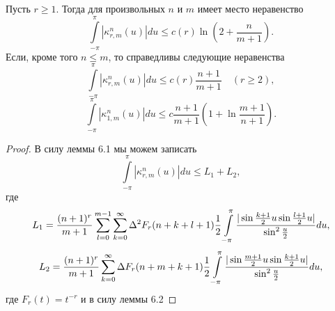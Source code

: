 \begin{lemma}\label{l6.3}
Пусть $r\ge1$. Тогда для произвольных $n$ и $m$ имеет место неравенство
$$
\int\limits_{-\pi}^{\pi}|\kappa_{r,m}^n(u)|du\le c(r)\ln\left(2+\frac{n}{m+1}\right) .
$$
Если, кроме того $n\le m$, то справедливы  следующие неравенства
$$
\int\limits_{-\pi}^{\pi}|\kappa_{r,m}^n(u)|du\le c(r)\frac{n+1}{m+1}\quad (r\ge2),
$$
$$
\int\limits_{-\pi}^{\pi}|\kappa_{1,m}^n(u)|du\le c\frac{n+1}{m+1}\left(1+\ln\frac{m+1}{n+1}\right).
$$





 \end{lemma}
\begin{proof}
 В силу леммы 6.1 мы можем записать
 \begin{equation}\label{6.25}
    \int\limits_{-\pi}^{\pi}|\kappa_{r,m}^n(u)|du\le L_1+L_2,
 \end{equation}
 где
 \begin{equation}\label{6.26}
    L_1={(n+1)^{r}\over m+1}
\sum\limits_{l=0}^{m-1}\sum\limits_{k=0}^{\infty}
\Delta^2F_r(n+k+l+1)\frac12\int\limits_{-\pi}^{\pi}
\frac{|\sin\frac{k+1}{2}u\sin\frac{l+1}{2}u|}{\sin^2\frac
u2}du,
 \end{equation}
 \begin{equation}\label{6.27}
L_2={(n+1)^{r}\over m+1}\sum\limits_{k=0}^{\infty}\Delta F_r(n+m+k+1)\frac12
\int\limits_{-\pi}^{\pi}\frac{|\sin\frac{m+1}{2}u\sin\frac{k+1}{2}u|}{\sin^2\frac u2}du,
 \end{equation}
где $F_r(t)=t^{-r}$ и в силу леммы 6.2


\end{proof}

